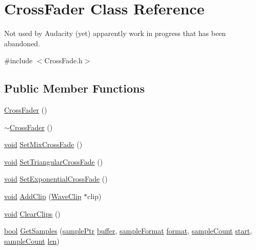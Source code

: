 \hypertarget{class_cross_fader}{}\section{Cross\+Fader Class Reference}
\label{class_cross_fader}


Not used by Audacity (yet) apparently work in progress that has been abandoned.  




{\ttfamily \#include $<$Cross\+Fade.\+h$>$}

\subsection*{Public Member Functions}
\begin{DoxyCompactItemize}
\item 
\hyperlink{class_cross_fader_a6505d887e90efa0732533f3c7e103cc9}{Cross\+Fader} ()
\item 
\hyperlink{class_cross_fader_ad24fcdbc8251c1ee2047b07e55265315}{$\sim$\+Cross\+Fader} ()
\item 
\hyperlink{sound_8c_ae35f5844602719cf66324f4de2a658b3}{void} \hyperlink{class_cross_fader_a88e834f73ed5a8962e7204c81904ad9e}{Set\+Mix\+Cross\+Fade} ()
\item 
\hyperlink{sound_8c_ae35f5844602719cf66324f4de2a658b3}{void} \hyperlink{class_cross_fader_a58eee67301333f5e985bd4a9988768cb}{Set\+Triangular\+Cross\+Fade} ()
\item 
\hyperlink{sound_8c_ae35f5844602719cf66324f4de2a658b3}{void} \hyperlink{class_cross_fader_a8a50ed6bb68d5830460feda6641d9bdb}{Set\+Exponential\+Cross\+Fade} ()
\item 
\hyperlink{sound_8c_ae35f5844602719cf66324f4de2a658b3}{void} \hyperlink{class_cross_fader_ad0f43ff382bec336c188ca04bcdce4ed}{Add\+Clip} (\hyperlink{class_wave_clip}{Wave\+Clip} $\ast$clip)
\item 
\hyperlink{sound_8c_ae35f5844602719cf66324f4de2a658b3}{void} \hyperlink{class_cross_fader_a9f6d39746e81922b71f9992cc3ff8f30}{Clear\+Clips} ()
\item 
\hyperlink{mac_2config_2i386_2lib-src_2libsoxr_2soxr-config_8h_abb452686968e48b67397da5f97445f5b}{bool} \hyperlink{class_cross_fader_abe245d4255020f77777b6c131a0b5fe8}{Get\+Samples} (\hyperlink{include_2audacity_2_types_8h_aaafb46d1caf7c79262fec96b577215fe}{sample\+Ptr} \hyperlink{structbuffer}{buffer}, \hyperlink{include_2audacity_2_types_8h_a9938d2e2f6adef23e745cd80ef379792}{sample\+Format} \hyperlink{_export_p_c_m_8cpp_a317afff57d87a89158c2b038d37b2b08}{format}, \hyperlink{include_2audacity_2_types_8h_afa427e1f521ea5ec12d054e8bd4d0f71}{sample\+Count} \hyperlink{seqread_8c_ac503262ae470564980711da4f78b1181}{start}, \hyperlink{include_2audacity_2_types_8h_afa427e1f521ea5ec12d054e8bd4d0f71}{sample\+Count} \hyperlink{lib_2expat_8h_af86d325fecfc8f47b61fbf5a5146f582}{len})
\end{DoxyCompactItemize}
